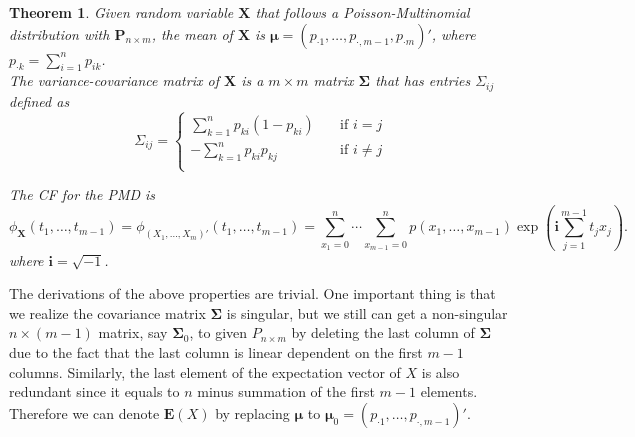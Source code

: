 \documentclass[12pt]{article}
\newcommand{\EE}{\mathbf{E}}
\newcommand{\ivec}{{\boldsymbol{i}}}
\newtheorem{thm}{Theorem}
\begin{document}
\begin{thm}
Given random variable $\boldsymbol{X}$ that follows a Poisson-Multinomial distribution with $\boldsymbol{P}_{n\times m}$, the mean of $\boldsymbol{X}$ is 
   $\boldsymbol{\mu} = \left( p_{\cdot1} ,\dots,p_{\cdot,m-1},p_{\cdot m}\right)'$, where $p_{\cdot k} = \sum_{i=1}^{n}p_{i k}$. \\
The variance-covariance matrix of $\boldsymbol{X}$ is a $m \times m$ matrix $\boldsymbol{\Sigma}$ that has entries $\Sigma_{ij}$ defined as
\begin{equation*}
   \Sigma_{ij} = 
           \begin{cases}
             \sum_{k=1}^{n}p_{ki}(1-p_{ki}) & \quad \text{if } i=j\\
             -\sum_{k=1}^{n}p_{ki}p_{kj} & \quad \text{if } i \neq j\\
           \end{cases}
\end{equation*}

The CF for the PMD is 
\begin{equation*}
\phi_{\boldsymbol{X}}(t_1, \dots, t_{m-1}) = \phi_{(X_1,\dots,X_m)'}(t_1, \dots, t_{m-1})  =  \sum_{x_1 = 0}^{n}\cdots \sum_{x_{m-1} = 0}^n p(x_1,\ldots,x_{m-1})\exp\left(\ivec\sum_{j=1}^{m-1}t_jx_j\right).
\end{equation*}
where  $\ivec=\sqrt{-1}$.
\end{thm}
The derivations of the above properties are trivial. One important thing is that we realize the covariance matrix $\boldsymbol{\Sigma}$ is singular, but we still can get a non-singular $n \times (m-1)$ matrix, say $\boldsymbol{\Sigma}_{0}$, to given $P_{n \times m}$ by deleting the last column of $\boldsymbol{\Sigma}$ due to the fact that the last column is linear dependent on the first $m-1$ columns. Similarly, the last element of the expectation vector of $X$ is also redundant since it equals to $n$ minus summation of the first $m-1$ elements. Therefore we can denote $\EE(X)$ by replacing $\boldsymbol{\mu}$ to $\boldsymbol{\mu}_0 = \left( p_{\cdot1} ,\dots,p_{\cdot,m-1}\right)'$.
\end{document}
